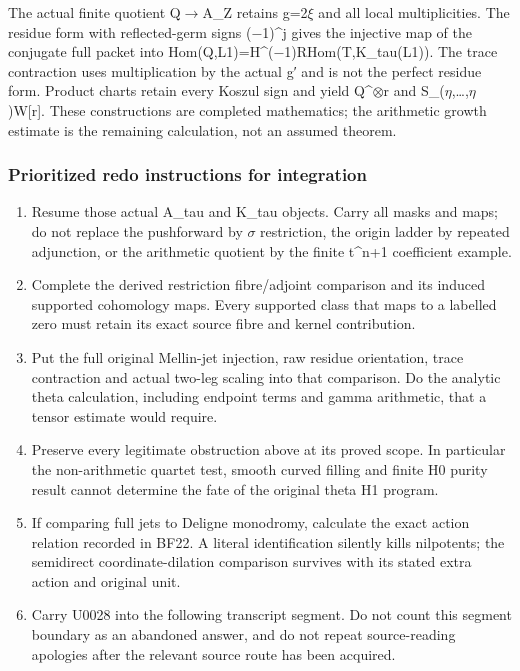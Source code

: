 The actual finite quotient Q\allowbreak{}\ensuremath{→}\allowbreak{}A\_Z
retains g=2\allowbreak{}\ensuremath{ξ}\allowbreak{} and all local
multiplicities. The residue form with reflected-germ signs
(\allowbreak{}\ensuremath{−}\allowbreak{}1)\textasciicircum{}j gives the
injective map of the conjugate full packet into
Hom(Q,L1)=H\textasciicircum{}(\allowbreak{}\ensuremath{−}\allowbreak{}1)RHom(T,K\_tau(L1)).
The trace contraction uses multiplication by the actual g′ and is not
the perfect residue form. Product charts retain every Koszul sign and
yield Q\textasciicircum{}\allowbreak{}\ensuremath{⊗}\allowbreak{}r and
S\_(\allowbreak{}\ensuremath{η}\allowbreak{},…,\allowbreak{}\ensuremath{η}\allowbreak{})W[r].
These constructions are completed mathematics; the arithmetic growth
estimate is the remaining calculation, not an assumed theorem.

\subsubsection{Prioritized redo instructions for
integration}\label{prioritized-redo-instructions-for-integration}

\begin{enumerate}
\def\labelenumi{\arabic{enumi}.}
\tightlist
\item
  Resume those actual A\_tau and K\_tau objects. Carry all masks and
  maps; do not replace the pushforward by
  \allowbreak{}\ensuremath{σ}\allowbreak{} restriction, the origin
  ladder by repeated adjunction, or the arithmetic quotient by the
  finite t\^{}n+1 coefficient example.
\item
  Complete the derived restriction fibre/adjoint comparison and its
  induced supported cohomology maps. Every supported class that maps to
  a labelled zero must retain its exact source fibre and kernel
  contribution.
\item
  Put the full original Mellin-jet injection, raw residue orientation,
  trace contraction and actual two-leg scaling into that comparison. Do
  the analytic theta calculation, including endpoint terms and gamma
  arithmetic, that a tensor estimate would require.
\item
  Preserve every legitimate obstruction above at its proved scope. In
  particular the non-arithmetic quartet test, smooth curved filling and
  finite H0 purity result cannot determine the fate of the original
  theta H1 program.
\item
  If comparing full jets to Deligne monodromy, calculate the exact
  action relation recorded in BF22. A literal identification silently
  kills nilpotents; the semidirect coordinate-dilation comparison
  survives with its stated extra action and original unit.
\item
  Carry U0028 into the following transcript segment. Do not count this
  segment boundary as an abandoned answer, and do not repeat
  source-reading apologies after the relevant source route has been
  acquired.
\end{enumerate}

